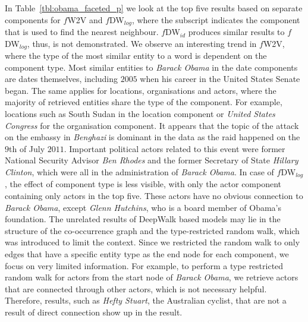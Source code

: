 In Table~\ref{tbl:obama_faceted_p} we look at the top five results based on separate components for $f$W2V and $f$DW$_{log}$, where the subscript indicates the component that is used to find the nearest neighbour. $f$DW$_{id}$ produces similar results to  $f$DW$_{log}$, thus, is not demonstrated. We observe an interesting trend in $f$W2V, where the type of the most similar entity to a word is dependent on the component type. Most similar entities to \emph{Barack Obama} in the date components are dates themselves, including $2005$ when his career in the United States Senate began. The same applies for locations, organisations and actors, where the majority of retrieved entities share the type of the component. For example, locations such as South Sudan in the location component or \emph{United States Congress} for the organisation component. It appears that the topic of the attack on the embassy in \emph{Benghazi} is dominant in the data as the raid happened on the $9$th of July $2011$. Important political actors related to this event were former National Security Advisor \emph{Ben Rhodes} and the former Secretary of State \emph{Hillary Clinton}, which were all in the administration of \emph{Barack Obama}. In case of $f$DW$_{log}$, the effect of component type is less visible, with only the actor component containing only actors in the top five. These actors have no obvious connection to \emph{Barack Obama}, except \emph{Glenn Hutchins}, who is a board member of Obama's foundation. The unrelated results of DeepWalk based models may lie in the structure of the co-occurrence graph and the type-restricted random walk, which was introduced to limit the context. Since we restricted the random walk to only edges that have a specific entity type as the end node for each component, we focus on very limited information. For example, to perform a type restricted random walk for actors from the start node of \emph{Barack Obama}, we retrieve actors that are connected through other actors, which is not necessary helpful. Therefore, results, such as \emph{Hefty Stuart}, the Australian cyclist, that are not a result of direct connection show up in the result.

